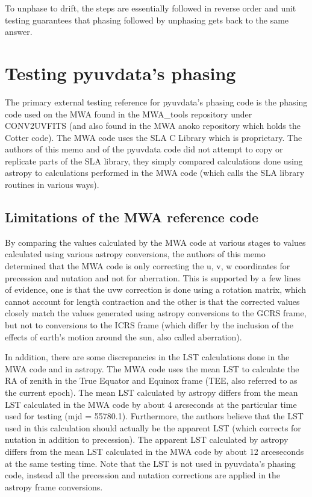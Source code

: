 \documentclass[11pt, oneside]{article}   	%
\begin{document}
To unphase to drift, the steps are essentially followed in reverse order and unit testing guarantees that phasing followed by unphasing gets back to the same answer. 

\section{Testing pyuvdata's phasing}

The primary external testing reference for pyuvdata's phasing code is the phasing code used on the MWA found in the MWA\_tools repository under CONV2UVFITS (and also found in the MWA anoko repository which holds the Cotter code). The MWA code uses the SLA C Library which is proprietary. The authors of this memo and of the pyuvdata code did not attempt to copy or replicate parts of the SLA library, they simply compared calculations done using astropy to calculations performed in the MWA code (which calls the SLA library routines in various ways).

\subsection{Limitations of the MWA reference code}
By comparing the values calculated by the MWA code at various stages to values calculated using various astropy conversions, the authors of this memo determined that the MWA code is only correcting the u, v, w coordinates for precession and nutation and not for aberration. This is supported by a few lines of evidence, one is that the uvw correction is done using a rotation matrix, which cannot account for length contraction and the other is that the corrected values closely match the values generated using astropy conversions to the GCRS frame, but not to conversions to the ICRS frame (which differ by the inclusion of the effects of earth's motion around the sun, also called aberration).

In addition, there are some discrepancies in the LST calculations done in the MWA code and in astropy. The MWA code uses the mean LST to calculate the RA of zenith in the True Equator and Equinox frame (TEE, also referred to as the current epoch). The mean LST calculated by astropy differs from the mean LST calculated in the MWA code by about 4 arcseconds at the particular time used for testing (mjd = 55780.1). Furthermore, the authors believe that the LST used in this calculation should actually be the apparent LST (which corrects for nutation in addition to precession). The apparent LST calculated by astropy differs from the mean LST calculated in the MWA code by about 12 arceseconds at the same testing time. Note that the LST is not used in pyuvdata's phasing code, instead all the precession and nutation corrections are applied in the astropy frame conversions.
\end{document}
